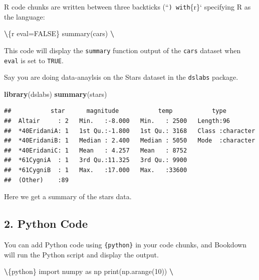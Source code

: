 \documentclass[
]{book}
\newenvironment{Shaded}{\begin{snugshade}}{\end{snugshade}}
\newcommand{\FunctionTok}[1]{\textcolor[rgb]{0.13,0.29,0.53}{\textbf{#1}}}
\newcommand{\NormalTok}[1]{#1}
\newcommand{\SpecialCharTok}[1]{\textcolor[rgb]{0.81,0.36,0.00}{\textbf{#1}}}
\theoremstyle{definition}
\theoremstyle{definition}
\theoremstyle{definition}
\theoremstyle{definition}
\theoremstyle{remark}
\begin{document}
R code chunks are written between three backticks (``\texttt{)\ with}\{r\}` specifying R as the language:

\begin{Shaded}
\begin{Highlighting}[]
\SpecialCharTok{\textbackslash{}\textasciigrave{}}\NormalTok{\textasciigrave{}\textasciigrave{}\{r eval=FALSE\}}
\NormalTok{summary(cars)}
\SpecialCharTok{\textbackslash{}\textasciigrave{}}\NormalTok{\textasciigrave{}\textasciigrave{}}
\end{Highlighting}
\end{Shaded}

This code will display the \texttt{summary} function output of the \texttt{cars} dataset when \texttt{eval} is set to \texttt{TRUE}.

Say you are doing data-anaylsis on the Stars dataset in the \texttt{dslabs} package.

\begin{Shaded}
\begin{Highlighting}[]
\FunctionTok{library}\NormalTok{(dslabs)}
\FunctionTok{summary}\NormalTok{(stars)}
\end{Highlighting}
\end{Shaded}

\begin{verbatim}
##           star      magnitude           temp           type          
##  Altair     : 2   Min.   :-8.000   Min.   : 2500   Length:96         
##  *40EridaniA: 1   1st Qu.:-1.800   1st Qu.: 3168   Class :character  
##  *40EridaniB: 1   Median : 2.400   Median : 5050   Mode  :character  
##  *40EridaniC: 1   Mean   : 4.257   Mean   : 8752                     
##  *61CygniA  : 1   3rd Qu.:11.325   3rd Qu.: 9900                     
##  *61CygniB  : 1   Max.   :17.000   Max.   :33600                     
##  (Other)    :89
\end{verbatim}

Here we get a summary of the stars data.

\subsection{2. Python Code}\label{python-code}

You can add Python code using \texttt{\{python\}} in your code chunks, and Bookdown will run the Python script and display the output.

\begin{Shaded}
\begin{Highlighting}[]
\SpecialCharTok{\textbackslash{}\textasciigrave{}}\NormalTok{\textasciigrave{}\textasciigrave{}\{python\}}
\NormalTok{import numpy as np}
\NormalTok{print(np.arange(10))}
\SpecialCharTok{\textbackslash{}\textasciigrave{}}\NormalTok{\textasciigrave{}\textasciigrave{}}
\end{Highlighting}
\end{Shaded}
\end{document}
